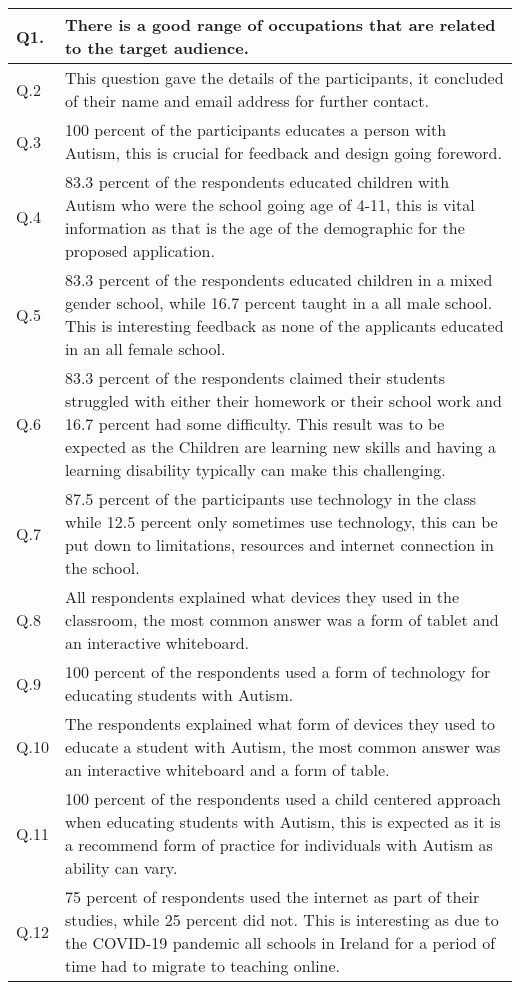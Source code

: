 \begin{table} [b]
    \centering
\begin{tabular}{ | m{3em} | m{10cm}| } 
\hline
Q1. & There is a good range of occupations that are related to the target audience. \\ 
\hline
Q.2 & This question gave the details of the participants, it concluded of their name and email address for further contact. \\ 
\hline
Q.3 & 100 percent of the participants educates a person with Autism, this is crucial for feedback and design going foreword.  \\ 
\hline
Q.4 & 83.3 percent of the respondents educated children with Autism who were the school going age of 4-11, this is vital information as that is the age of the demographic for the proposed application.  \\ 
\hline
Q.5 & 83.3 percent of the respondents educated children in a mixed gender school, while 16.7 percent taught in a all male school. This is interesting feedback as none of the applicants educated in an all female school.  \\ 
\hline
Q.6 & 83.3 percent of the respondents claimed their students struggled with either their homework or their school work and 16.7 percent had some difficulty. This result was to be expected as the Children are learning new skills and having a learning disability typically can make this challenging.   \\ 
\hline
Q.7 & 87.5 percent of the participants use technology in the class while 12.5 percent only sometimes use technology, this can be put down to limitations, resources and internet connection in the school. \\ 
\hline
Q.8 & All respondents explained what devices they used in the classroom, the most common answer was a form of tablet and an interactive whiteboard. \\ 
\hline
Q.9 & 100 percent of the respondents used a form of technology for educating students with Autism. \\ 
\hline
Q.10 & The respondents explained what form of devices they used to educate a student with Autism, the most common answer was an interactive whiteboard and a form of table. \\ 
\hline
Q.11 & 100 percent of the respondents used a child centered approach when educating students with Autism, this is expected as it is a recommend form of practice for individuals with Autism as ability can vary. \\ 
\hline
Q.12 & 75 percent of respondents used the internet as part of their studies, while 25 percent did not. This is interesting as due to the COVID-19 pandemic all schools in Ireland for a period of time had to migrate to teaching online. \\ 
\hline


\end{tabular}
\end{table}
